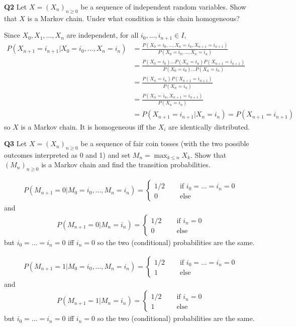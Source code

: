 \documentclass[hidelinks, 12pt]{article}
\theoremstyle{mydefstyle}
\theoremstyle{mythmstyle}
\begin{document}
\textbf{Q2} Let $X = (X_n)_{n \ge 0}$ be a sequence of independent random variables. Show that $X$ is a Markov chain. Under what condition is this chain homogeneous?

Since $X_0, X_1, \dots, X_n$ are independent, for all $i_0, \dots, i_{n+1} \in I$,
\begin{align*}
P(X_{n+1} = i_{n+1} \vert X_0 = i_0, \dots, X_n = i_n)
&= \frac{P(X_0 = i_0, \dots, X_n = i_n, X_{n+1} = i_{n+1})}{P(X_0 = i_0, \dots, X_n = i_n)} \\
&= \frac{P(X_0 = i_0) \dots P(X_n = i_n) P(X_{n+1} = i_{n+1})}{P(X_0 = i_0) \dots P(X_n = i_n)} \\
&= \frac{P(X_n = i_n) P(X_{n+1} = i_{n+1})}{P(X_n = i_n)} \\
&= \frac{P(X_n = i_n, X_{n+1} = i_{n+1})}{P(X_n = i_n)} \\
&= P(X_{n+1} = i_{n+1} \vert X_n = i_n) = P(X_{n+1} = i_{n+1})
\end{align*}
so $X$ is a Markov chain. It is homogeneous iff the $X_i$ are identically distributed. 

\textbf{Q3} Let $X = (X_n)_{n \ge 0}$ be a sequence of fair coin tosses (with the two possible outcomes interpreted as 0 and 1) and set $M_n = \max_{k \le n} X_k$. Show that $(M_n)_{n \ge 0}$ is a Markov chain and find the transition probabilities. 

\begin{gather*}
P(M_{n+1} = 0 \vert M_0 = i_0, \dots, M_n = i_n)
= \begin{cases}
1/2 \quad&\mbox{ if $i_0 = \dots = i_n = 0$} \\
0 \quad&\mbox{ else}
\end{cases}
\end{gather*}
and
\begin{gather*}
P(M_{n+1} = 0 \vert M_n = i_n) = \begin{cases}
1/2 \quad&\mbox{ if $i_n = 0$} \\
0 \quad&\mbox{ else}
\end{cases}
\end{gather*}
but $i_0 = \dots = i_n = 0$ iff $i_n = 0$ so the two (conditional) probabilities are the same. 

\begin{gather*}
P(M_{n+1} = 1 \vert M_0 = i_0, \dots, M_n = i_n)
= \begin{cases}
1/2 \quad&\mbox{ if $i_0 = \dots = i_n = 0$} \\
1 \quad&\mbox{ else}
\end{cases}
\end{gather*}
and
\begin{gather*}
P(M_{n+1} = 1 \vert M_n = i_n) = \begin{cases}
1/2 \quad&\mbox{ if $i_n = 0$} \\
1 \quad&\mbox{ else}
\end{cases}
\end{gather*}
but $i_0 = \dots = i_n = 0$ iff $i_n = 0$ so the two (conditional) probabilities are the same. 
\end{document}
